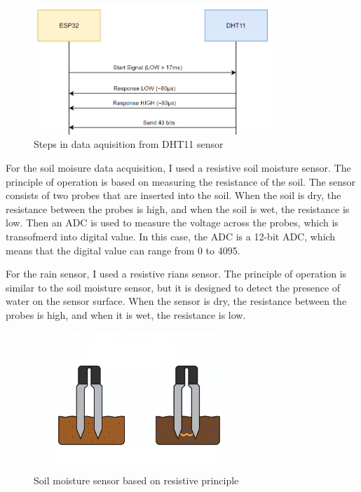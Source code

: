 \begin{figure}[H]
    \centering
    \includegraphics[width=0.8\textwidth]{images/dht-steps.png}
    \caption{Steps in data aquisition from DHT11 sensor}
    \label{fig:dht-steps}
\end{figure}

For the soil moisure data acquisition, I used a resistive soil moisture sensor. The principle of operation is based
on measuring the resistance of the soil. The sensor consists of two probes that are inserted into the soil.
When the soil is dry, the resistance between the probes is high, and when the soil is wet, the resistance is low\cite{s20020363}.
Then an ADC is used to measure the voltage across the probes, which is transofmerd into digital value. In this case, the
ADC is a 12-bit ADC, which means that the digital value can range from 0 to 4095.

For the rain sensor, I used a resistive rians sensor. The principle of operation is similar to the soil moisture sensor,
but it is designed to detect the presence of water on the sensor surface. 
When the sensor is dry, the resistance between the probes is high, and when it is wet, the resistance is low.

\begin{figure}[H]
    \centering
    \includegraphics[width=0.7\textwidth]{images/moisture-sensor.png}
    \caption{Soil moisture sensor based on resistive principle}
    \label{fig:moisture-sensor}
\end{figure}

